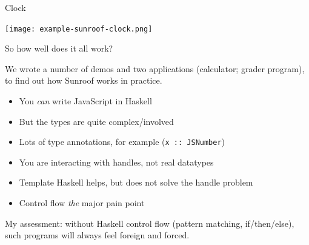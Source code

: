 \documentclass{beamer}
\begin{document}
\begin{frame}[fragile]{Clock}
        
\texttt{[image: example-sunroof-clock.png]}

\end{frame}        



\begin{frame}[fragile]{So how well does it all work?}

We wrote a number of demos and two applications (calculator; grader program),
to find out how Sunroof works in practice.
        
\begin{itemize}
\item You {\em can\/} write JavaScript in Haskell
\item But the types are quite complex/involved
\item Lots of type annotations, for example (\verb|x :: JSNumber|)
\item You are interacting with handles, not real datatypes 
\item Template Haskell helps, but does not solve the handle problem
\item Control flow {\em the\/} major pain point
\end{itemize}                

My assessment: without Haskell control flow (pattern matching, if/then/else),
such programs will always feel foreign and forced.

\end{frame}
\end{document}
